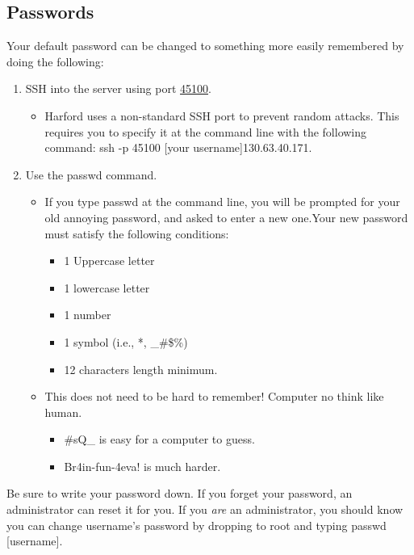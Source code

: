 \documentclass[final,titlepage,letterpaper,oneside,12pt]{article}
\renewcommand{\texttt}[2][BrickRed]{\textcolor{#1}{\ttfamily #2}}%
\begin{document}
\subsection{Passwords}

Your default password can be changed to something more easily remembered by doing the following:
\begin{enumerate} \itemsep-2pt
    \item{SSH into the server using port \href{http://en.wikipedia.org/wiki/Looking_Glass_Studios}{45100}.}
    \begin{itemize} \itemsep-2pt
        \item{Harford uses a non-standard SSH port to prevent random attacks. This requires you to specify it at the command line with the following command: \texttt{ssh -p 45100 [your username]\@130.63.40.171}.}
    \end{itemize}
    \item{Use the \texttt{passwd} command.}
    \begin{itemize} \itemsep-2pt
        \item{If you type passwd at the command line, you will be prompted for your old annoying password, and asked to enter a new one.Your new password must satisfy the following conditions:}
        \begin{itemize} \itemsep-2pt
            \item{1 Uppercase letter}
            \item{1 lowercase letter}
            \item{1 number}
            \item{1 symbol (i.e., *, \_\#\$\%)}
            \item{12 characters length minimum.}
        \end{itemize}
        \item{This does not need to be hard to remember! Computer no think like human.}
        \begin{itemize} \itemsep-2pt
            \item{\texttt{\#sQ\_} is easy for a computer to guess.}
            \item{\texttt{Br4in-fun-4eva!} is much harder.}
        \end{itemize}
    \end{itemize}
\end{enumerate}

Be sure to write your password down. If you forget your password, an administrator can reset it for you. If you \textit{are} an administrator, you should know you can change \texttt{username}'s password by dropping to \texttt{root} and typing \texttt{passwd [username]}.
\end{document}

